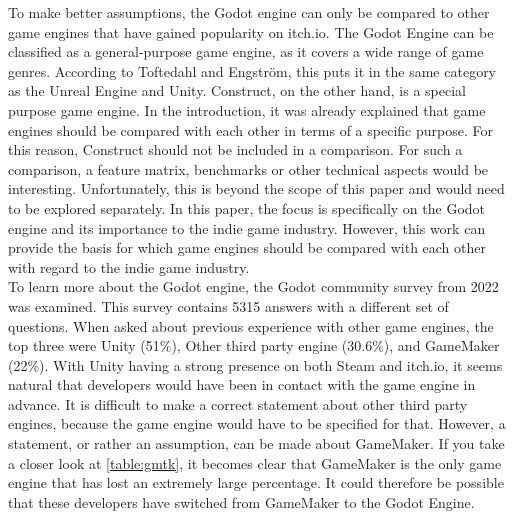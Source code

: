 To make better assumptions, the Godot engine can only be compared to other game engines that have gained popularity on itch.io.
The Godot Engine can be classified as a general-purpose game engine, as it covers a wide range of game genres.
According to Toftedahl and Engström, this puts it in the same category as the Unreal Engine and Unity.
Construct, on the other hand, is a special purpose game engine.
In the introduction, it was already explained that game engines should be compared with each other in terms of a specific purpose.
For this reason, Construct should not be included in a comparison.
For such a comparison, a feature matrix, benchmarks or other technical aspects would be interesting.
Unfortunately, this is beyond the scope of this paper and would need to be explored separately.
In this paper, the focus is specifically on the Godot engine and its importance to the indie game industry.
However, this work can provide the basis for which game engines should be compared with each other with regard to the indie game industry.\\

To learn more about the Godot engine, the Godot community survey from 2022 was examined. 
This survey contains 5315 answers with a different set of questions. 
When asked about previous experience with other game engines, the top three were Unity (51\%), Other third party engine (30.6\%), and GameMaker (22\%).
With Unity having a strong presence on both Steam and itch.io, it seems natural that developers would have been in contact with the game engine in advance. 
It is difficult to make a correct statement about other third party engines, because the game engine would have to be specified for that. 
However, a statement, or rather an assumption, can be made about GameMaker.
If you take a closer look at \autoref{table:gmtk}, it becomes clear that GameMaker is the only game engine that has lost an extremely large percentage.
It could therefore be possible that these developers have switched from GameMaker to the Godot Engine. 



